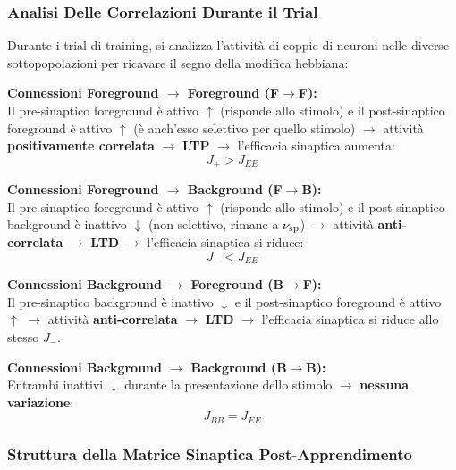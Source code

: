 \subsubsection{Analisi Delle Correlazioni Durante il Trial}

Durante i trial di training, si analizza l'attività di coppie di neuroni nelle diverse sottopopolazioni per ricavare il segno della modifica hebbiana:

\textbf{Connessioni Foreground $\rightarrow$ Foreground (F$\rightarrow$F):}\\
Il pre-sinaptico foreground è attivo $\uparrow$ (risponde allo stimolo) e il post-sinaptico foreground è attivo $\uparrow$ (è anch'esso selettivo per quello stimolo) $\rightarrow$ attività \textbf{positivamente correlata} $\rightarrow$ \textbf{LTP} $\rightarrow$ l'efficacia sinaptica aumenta:
\begin{equation}
J_+ > J_{EE}
\end{equation}

\textbf{Connessioni Foreground $\rightarrow$ Background (F$\rightarrow$B):}\\
Il pre-sinaptico foreground è attivo $\uparrow$ (risponde allo stimolo) e il post-sinaptico background è inattivo $\downarrow$ (non selettivo, rimane a $\nu_{\rm sp}$) $\rightarrow$ attività \textbf{anti-correlata} $\rightarrow$ \textbf{LTD} $\rightarrow$ l'efficacia sinaptica si riduce:
\begin{equation}
J_- < J_{EE}
\end{equation}

\textbf{Connessioni Background $\rightarrow$ Foreground (B$\rightarrow$F):}\\
Il pre-sinaptico background è inattivo $\downarrow$ e il post-sinaptico foreground è attivo $\uparrow$ $\rightarrow$ attività \textbf{anti-correlata} $\rightarrow$ \textbf{LTD} $\rightarrow$ l'efficacia sinaptica si riduce allo stesso $J_-$.

\textbf{Connessioni Background $\rightarrow$ Background (B$\rightarrow$B):}\\
Entrambi inattivi $\downarrow$ durante la presentazione dello stimolo $\rightarrow$ \textbf{nessuna variazione}:
\begin{equation}
J_{BB} = J_{EE}
\end{equation}

\subsubsection{Struttura della Matrice Sinaptica Post-Apprendimento}

